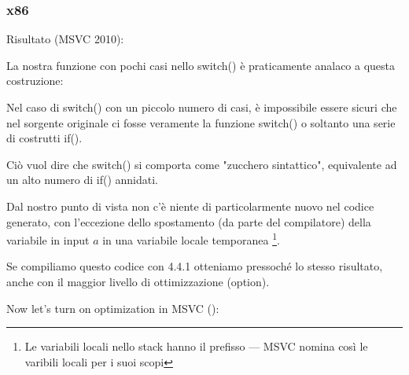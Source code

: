 \subsubsection{x86}


Risultato (MSVC 2010):



La nostra funzione con pochi casi nello switch() è praticamente analaco a questa costruzione:




Nel caso di switch() con un piccolo numero di casi, è impossibile essere sicuri che nel sorgente originale ci fosse
veramente la funzione switch() o soltanto una serie di costrutti if().


\myindex{\SyntacticSugar}

Ciò vuol dire che switch() si comporta come "zucchero sintattico", equivalente ad un alto numero di if() annidati.

Dal nostro punto di vista non c'è niente di particolarmente nuovo nel codice generato,
con l'eccezione dello spostamento (da parte del compilatore) della variabile in input $a$ in una variabile locale temporanea 
\footnote{Le variabili locali nello stack hanno il prefisso --- MSVC nomina così le varibili locali per i suoi scopi}.

Se compiliamo questo codice con 4.4.1 otteniamo pressoché lo stesso risultato, anche con il maggior livello di ottimizzazione (\Othree option).


Now let's turn on optimization in MSVC (\Ox): 

\label{JMP_instead_of_RET}


